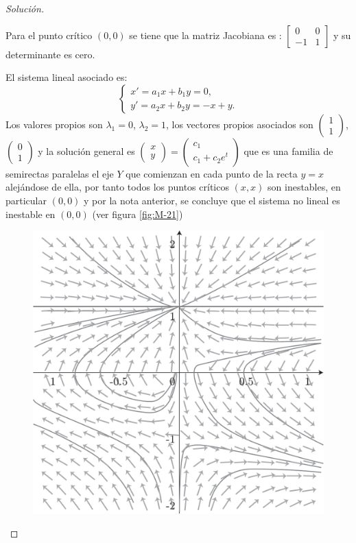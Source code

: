 \documentclass[a5paper,doc,10pt,noapacite]{apa6}
\begin{document}
{{\begin{proof}[Solución]
	\begin{APAitemize}
		\item Para el punto crítico \((0,0)\) se tiene que la matriz Jacobiana es : \(\begin{bmatrix} 0 & 0 \\ -1 & 1 \end{bmatrix}\) y su determinante es  cero.
		
		El sistema lineal asociado es:
		\[
		\begin{cases}
			x' = a_1 x + b_1 y = 0,
			\\
			y' = a_2x+b_2y=-x+y.
		\end{cases}
		\]
		Los valores propios son \(\lambda_1=0\), \(\lambda_2=1\), los vectores propios asociados son \(\begin{pmatrix} 1 \\ 1\end{pmatrix}\), \(\begin{pmatrix} 0 \\ 1 \end{pmatrix}\) y la solución general es \(\begin{pmatrix} x \\ y \end{pmatrix}=\begin{pmatrix} c_1 \\ c_1+c_2e^t \end{pmatrix}\) que es una familia de semirectas paralelas el eje \(Y\) que comienzan en cada punto de la recta \(y = x\) alejándose de ella, por tanto todos los puntos críticos \(( x, x )\) son inestables, en particular \(( 0 , 0 )\) y por la nota anterior, se concluye que el sistema no lineal es inestable en \(( 0 , 0 )\) (ver figura \ref{fig:M-21})
		\vspace{-1\baselineskip}
	\begin{figure}[H]
		\captionsetup{justification=centering, labelfont=footnotesize, font=footnotesize}
		\centering
		\includegraphics[scale=0.35]{Graficos/figura21}
	

\end{figure}
\end{APAitemize}
\end{proof}}}
\end{document}
